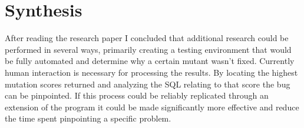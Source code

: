 \documentclass[11pt]{article}
\begin{document}
\vspace*{-.1in}
\section{Synthesis}
\label{sec:synthesis}
\vspace*{-.1in}

After reading the research paper I concluded that additional research could be performed in several ways, primarily creating a testing environment that would be fully automated and determine why a certain mutant wasn't fixed. Currently human interaction is necessary for processing the results. By locating the highest mutation scores returned and analyzing the SQL relating to that score the bug can be pinpointed. If this process could be reliably replicated through an extension of the program it could be made significantly more effective and reduce the time spent pinpointing a specific problem.



\end{document}
